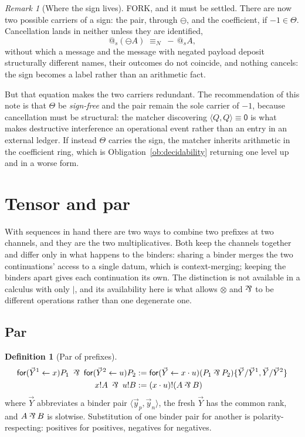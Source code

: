 \documentclass[11pt]{article}
\makeatletter
\theoremstyle{definition}
\newtheorem{definition}[theorem]{Definition}
\theoremstyle{remark}
\newtheorem{remark}[theorem]{Remark}
\newcommand{\pzero}{\mathsf{0}}
\newcommand{\quo}[1]{\ensuremath{@_{#1}}}
\newcommand{\dip}[2]{\ensuremath{\langle #1 , #2 \rangle}}
\newcommand{\negop}{\ensuremath{\ominus}}
\newcommand{\scong}{\ensuremath{\equiv}}
\newcommand{\nameq}{\ensuremath{\equiv_{N}}}
\newcommand{\parr}{\mathbin{\rotatebox[origin=c]{180}{\&}}}
\makeatother
\begin{document}
\begin{remark}[Where the sign lives]
\label{rem:wherethesign}
FORK, and it must be settled. There are now two possible carriers of a sign: the
pair, through $\negop$, and the coefficient, if $-1 \in \Theta$. Cancellation
lands in neither unless they are identified,
\[
  \quo{s}(\negop A) \;\nameq\; -\,\quo{s}A ,
\]
without which a message and the message with negated payload deposit
structurally different names, their outcomes do not coincide, and nothing
cancels: the sign becomes a label rather than an arithmetic fact.

But that equation makes the two carriers redundant. The recommendation of this
note is that $\Theta$ be \emph{sign-free} and the pair remain the sole carrier
of $-1$, because cancellation must be structural: the matcher discovering
$\dip{Q}{Q} \scong \pzero$ is what makes destructive interference an operational
event rather than an entry in an external ledger. If instead $\Theta$ carries
the sign, the matcher inherits arithmetic in the coefficient ring, which is
Obligation~\ref{ob:decidability} returning one level up and in a worse form.
\end{remark}

\section{Tensor and par}
\label{sec:tensor}

With sequences in hand there are two ways to combine two prefixes at two
channels, and they are the two multiplicatives. Both keep the channels together
and differ only in what happens to the binders: sharing a binder merges the two
continuations' access to a single datum, which is context-merging; keeping the
binders apart gives each continuation its own. The distinction is not available
in a calculus with only $\mid$, and its availability here is what allows
$\otimes$ and $\parr$ to be different operations rather than one degenerate one.

\subsection{Par}

\begin{definition}[Par of prefixes]
\label{def:parr}
\begin{align*}
  \mathsf{for}(\vec{Y}^{1} \leftarrow x)P_1 \;\parr\;
  \mathsf{for}(\vec{Y}^{2} \leftarrow u)P_2
  &:= \mathsf{for}(\vec{Y} \leftarrow x \cdot u)
      (P_1 \parr P_2)\{\vec{Y}/\vec{Y}^{1}, \vec{Y}/\vec{Y}^{2}\} \\
  x!A \;\parr\; u!B &:= (x \cdot u)!(A \parr B)
\end{align*}
where $\vec{Y}$ abbreviates a binder pair $\dip{\vec{y}_p}{\vec{y}_n}$, the
fresh $\vec{Y}$ has the common rank, and $A \parr B$ is slotwise. Substitution
of one binder pair for another is polarity-respecting: positives for positives,
negatives for negatives.
\end{definition}
\end{document}
